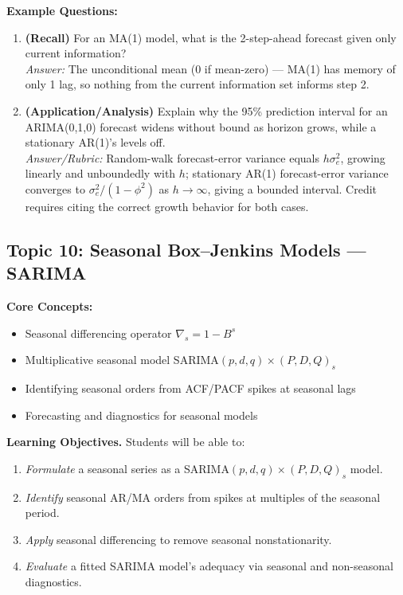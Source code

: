 \documentclass[11pt]{article}
\begin{document}
\textbf{Example Questions:}
\begin{enumerate}
\item \textbf{(Recall)} For an MA(1) model, what is the 2-step-ahead forecast given only current information? \\
\emph{Answer:} The unconditional mean (0 if mean-zero) --- MA(1) has memory of only 1 lag, so nothing from the current information set informs step 2.
\item \textbf{(Application/Analysis)} Explain why the 95\% prediction interval for an ARIMA(0,1,0) forecast widens without bound as horizon grows, while a stationary AR(1)'s levels off. \\
\emph{Answer/Rubric:} Random-walk forecast-error variance equals $h\sigma_e^2$, growing linearly and unboundedly with $h$; stationary AR(1) forecast-error variance converges to $\sigma_e^2/(1-\phi^2)$ as $h\to\infty$, giving a bounded interval. Credit requires citing the correct growth behavior for both cases.
\end{enumerate}

\subsection{Topic 10: Seasonal Box--Jenkins Models --- SARIMA}

\textbf{Core Concepts:}
\begin{itemize}
\item Seasonal differencing operator $\nabla_s = 1-B^s$
\item Multiplicative seasonal model SARIMA$(p,d,q)\times(P,D,Q)_s$
\item Identifying seasonal orders from ACF/PACF spikes at seasonal lags
\item Forecasting and diagnostics for seasonal models
\end{itemize}

\textbf{Learning Objectives.} Students will be able to:
\begin{enumerate}
\item \emph{Formulate} a seasonal series as a SARIMA$(p,d,q)\times(P,D,Q)_s$ model.
\item \emph{Identify} seasonal AR/MA orders from spikes at multiples of the seasonal period.
\item \emph{Apply} seasonal differencing to remove seasonal nonstationarity.
\item \emph{Evaluate} a fitted SARIMA model's adequacy via seasonal and non-seasonal diagnostics.
\end{enumerate}
\end{document}
